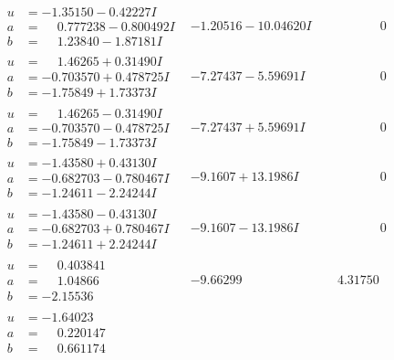 \documentclass[1p]{elsarticle_modified}
\theoremstyle{definition}
\begin{document}
$$\begin{array}{c|c|c}
\begin{aligned}
u &= -1.35150 - 0.42227 I \\
a &= \phantom{-}0.777238 - 0.800492 I \\
b &= \phantom{-}1.23840 - 1.87181 I\end{aligned}
 & -1.20516 - 10.04620 I & \phantom{-0.000000 } 0 \\ \hline\begin{aligned}
u &= \phantom{-}1.46265 + 0.31490 I \\
a &= -0.703570 + 0.478725 I \\
b &= -1.75849 + 1.73373 I\end{aligned}
 & -7.27437 - 5.59691 I & \phantom{-0.000000 } 0 \\ \hline\begin{aligned}
u &= \phantom{-}1.46265 - 0.31490 I \\
a &= -0.703570 - 0.478725 I \\
b &= -1.75849 - 1.73373 I\end{aligned}
 & -7.27437 + 5.59691 I & \phantom{-0.000000 } 0 \\ \hline\begin{aligned}
u &= -1.43580 + 0.43130 I \\
a &= -0.682703 - 0.780467 I \\
b &= -1.24611 - 2.24244 I\end{aligned}
 & -9.1607 + 13.1986 I & \phantom{-0.000000 } 0 \\ \hline\begin{aligned}
u &= -1.43580 - 0.43130 I \\
a &= -0.682703 + 0.780467 I \\
b &= -1.24611 + 2.24244 I\end{aligned}
 & -9.1607 - 13.1986 I & \phantom{-0.000000 } 0 \\ \hline\begin{aligned}
u &= \phantom{-}0.403841\phantom{ +0.000000I} \\
a &= \phantom{-}1.04866\phantom{ +0.000000I} \\
b &= -2.15536\phantom{ +0.000000I}\end{aligned}
 & -9.66299\phantom{ +0.000000I} & \phantom{-}4.31750\phantom{ +0.000000I} \\ \hline\begin{aligned}
u &= -1.64023\phantom{ +0.000000I} \\
a &= \phantom{-}0.220147\phantom{ +0.000000I} \\
b &= \phantom{-}0.661174\phantom{ +0.000000I}\end{aligned}

\end{array}$$
\end{document}
